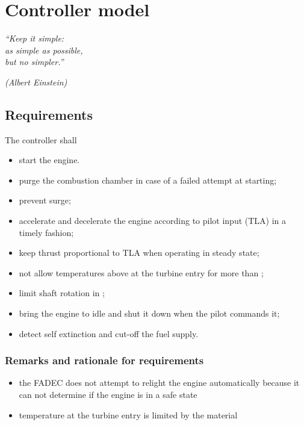 \chapter{Controller model}
\label{ch:control}
\epigraph{\em ``Keep it simple:\\
as simple as possible,\\
but no simpler.''}{\em (Albert Einstein)}

\section{Requirements}
The controller shall
\begin{itemize}
    \item start the engine.
    \item purge the combustion chamber in case of a failed attempt at starting;
    \item prevent surge;
    \item accelerate and decelerate the engine according to pilot input (\acs{TLA}) in a timely fashion;
    \item keep thrust proportional to \gls{TLA} when operating in steady state;
    \item not allow temperatures above  at the turbine entry for more than ;
    \item limit shaft rotation in ;
    \item bring the engine to idle and shut it down when the pilot commands it;
    \item detect self extinction and cut-off the fuel supply.
\end{itemize}

\subsection{Remarks and rationale for requirements}
\begin{itemize}
    \item the \gls{FADEC} does not attempt to relight the engine automatically 
          because it can not determine if the engine is in a safe state
    \item temperature at the turbine entry is limited by the material 
\end{itemize}

